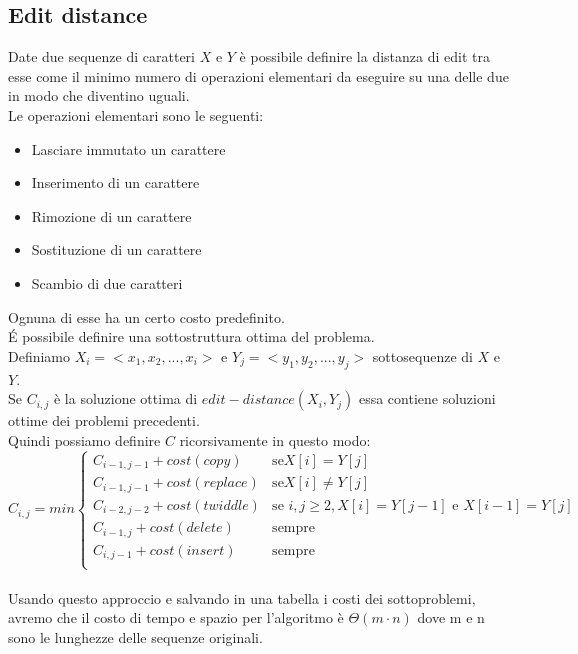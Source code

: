 \documentclass[]{article}
\begin{document}
\subsection{Edit distance}
Date due sequenze di caratteri $X$ e $Y$ è possibile definire la distanza di edit tra esse come il minimo numero di operazioni elementari da eseguire su una delle due in modo che diventino uguali.\\
Le operazioni elementari sono le seguenti:\\
\begin{itemize}
\item Lasciare immutato un carattere
\item Inserimento di un carattere
\item Rimozione di un carattere
\item Sostituzione di un carattere
\item Scambio di due caratteri
\end{itemize}
Ognuna di esse ha un certo costo predefinito.\\
\'E possibile definire una sottostruttura ottima del problema.\\
Definiamo $X_i=<x_1,x_2,...,x_i>$ e $Y_j=<y_1,y_2,...,y_j>$ sottosequenze di $X$ e $Y$.\\
Se $C_{i,j}$ è la soluzione ottima di $edit-distance(X_i,Y_j)$ essa contiene soluzioni ottime dei problemi precedenti.\\
Quindi possiamo definire $C$ ricorsivamente in questo modo:\\
\[
C_{i,j} = min
\begin{cases}
C_{i-1,j-1} + cost(copy)    & \mbox{se} X[i]=Y[j]\\
C_{i-1,j-1} + cost(replace) & \mbox{se} X[i]\neq Y[j]\\
C_{i-2,j-2} + cost(twiddle) & \mbox{se } i,j\geq 2, X[i]=Y[j-1] \mbox{ e } X[i-1]=Y[j]\\
C_{i-1,j} + cost(delete)    & \mbox{sempre}\\
C_{i,j-1} + cost(insert)    & \mbox{sempre} \\
\end{cases}
\]
\\
Usando questo approccio e salvando in una tabella i costi dei sottoproblemi, avremo che il costo di tempo e spazio per l'algoritmo è $\Theta(m\cdot n)$ dove m e n sono le lunghezze delle sequenze originali.\\
\end{document}
